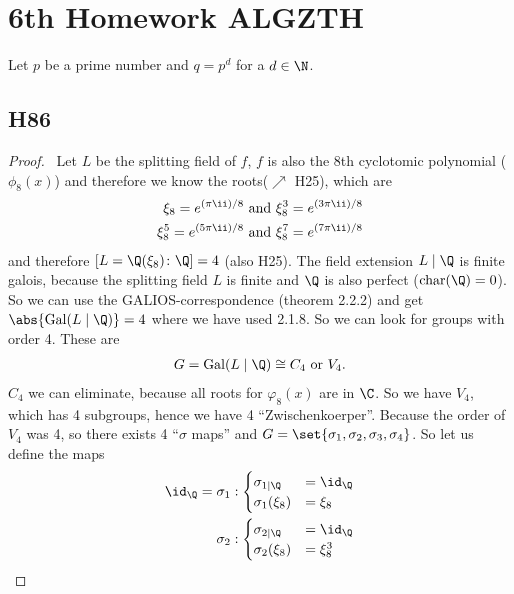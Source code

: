 
\section{6th Homework ALGZTH}
Let $p$ be a prime number and $q=p^d$ for a $d \in \N$.
\subsection{H86}
\begin{proof}\
	Let $L$ be the splitting field of $f$, $f$ is also the 8th cyclotomic polynomial ($\phi_8(x)$) and therefore we know the roots($\nearrow$ H25), which are
	\begin{align*}
		\xi_8 = e^{(\pi \ii)/8} \and 
		\xi^3_8 = e^{(3\pi \ii)/8}\\
		\xi_8^5 = e^{(5\pi \ii)/8} \and
		\xi_8^7 = e^{(7\pi \ii)/8}
	\end{align*}
	and therefore $[L=\Q(\xi_8)\colon \Q] = 4$ (also H25). The field extension $L \mid \Q$ is finite galois, because the splitting field $L$ is finite and $\Q$ is also perfect ($\chara(\Q) = 0$). So we can use the GALIOS-correspondence (theorem 2.2.2) and get $\abs{\Gal(L\mid \Q)} = 4$ where we have used 2.1.8. So we can look for groups with order 4. These are
	\begin{align*}
		G = \Gal(L \mid \Q) \cong C_4 \text{ or } V_4.
	\end{align*}
	$C_4$ we can eliminate, because all roots for $\varphi_8(x)$ are in $\C$. So we have $V_4$, which has 4 subgroups, hence we have 4 ``Zwischenkoerper''. %
	Because the order of $V_4$ was 4, so there exists 4 ``$\sigma$ maps'' and $G = \set{\sigma_1, \sigma_2, \sigma_3,\sigma_4}$. So let us define the maps
	\begin{align*}
		\id_{\Q} = \sigma_1:\begin{cases}
			\sigma_{1\mid \Q} &= \id_{\Q}\\
			\sigma_1(\xi_8) &= \xi_8
		\end{cases}\\
		\sigma_2:\begin{cases}
		\sigma_{2\mid \Q} &= \id_{\Q}\\
		\sigma_2(\xi_8) &= \xi_8^3

\end{cases}
\end{align*}
\end{proof}
